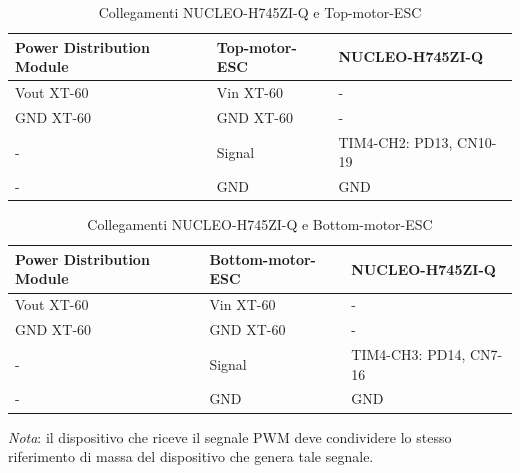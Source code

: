 \documentclass[11pt]{report}
\begin{document}
	\begin{table}[H]
		\centering
		\begin{tabular}{l l l}
			\toprule
			\textbf{Power Distribution Module} & \textbf{Top-motor-ESC} & \textbf{NUCLEO-H745ZI-Q} \\
			\midrule
			Vout XT-60 & Vin XT-60 & - \\
			GND XT-60 & GND XT-60 & - \\
			- & Signal & TIM4-CH2: PD13, CN10-19 \\
			- & GND & GND \\
			\bottomrule
		\end{tabular}
		\caption{Collegamenti NUCLEO-H745ZI-Q e Top-motor-ESC}
		\label{tab:collegamenti-top-esc}
	\end{table}

	\begin{table}[H]
		\centering
		\begin{tabular}{l l l}
			\toprule
			\textbf{Power Distribution Module} & \textbf{Bottom-motor-ESC} & \textbf{NUCLEO-H745ZI-Q} \\
			\midrule
			Vout XT-60 & Vin XT-60 & - \\
			GND XT-60 & GND XT-60 & - \\
			- & Signal & TIM4-CH3: PD14, CN7-16 \\
			- & GND & GND \\
			\bottomrule
		\end{tabular}
		\caption{Collegamenti NUCLEO-H745ZI-Q e Bottom-motor-ESC}
		\label{tab:collegamenti-bottom-esc}
	\end{table}

	\textit{Nota}: il dispositivo che riceve il segnale PWM deve condividere lo stesso riferimento di massa del dispositivo che genera tale segnale.
\end{document}
